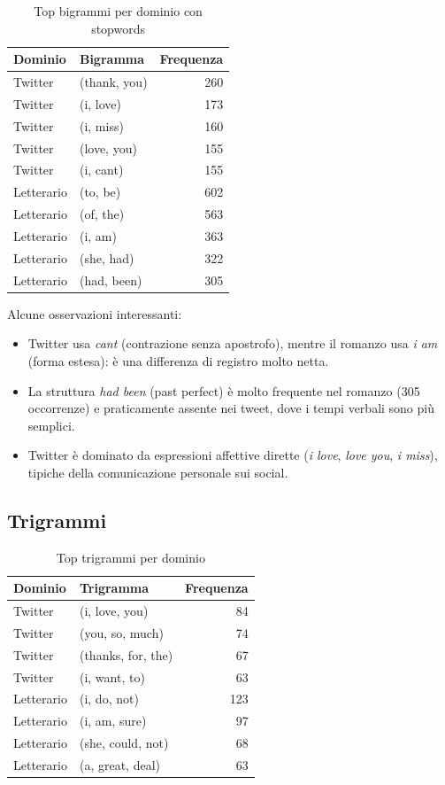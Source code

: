 \documentclass[12pt, a4paper]{article}
\begin{document}
\begin{table}[H]
\centering
\begin{tabular}{llr}
\toprule
\textbf{Dominio} & \textbf{Bigramma} & \textbf{Frequenza} \\
\midrule
Twitter & (thank, you) & 260 \\
Twitter & (i, love)    & 173 \\
Twitter & (i, miss)    & 160 \\
Twitter & (love, you)  & 155 \\
Twitter & (i, cant)    & 155 \\
\midrule
Letterario & (to, be)    & 602 \\
Letterario & (of, the)   & 563 \\
Letterario & (i, am)     & 363 \\
Letterario & (she, had)  & 322 \\
Letterario & (had, been) & 305 \\
\bottomrule
\end{tabular}
\caption{Top bigrammi per dominio con stopwords}
\end{table}

Alcune osservazioni interessanti:
\begin{itemize}[leftmargin=1.5cm]
    \item Twitter usa \textit{cant} (contrazione senza apostrofo),
          mentre il romanzo usa \textit{i am} (forma estesa): è una
          differenza di registro molto netta.
    \item La struttura \textit{had been} (past perfect) è molto
          frequente nel romanzo (305 occorrenze) e praticamente
          assente nei tweet, dove i tempi verbali sono più semplici.
    \item Twitter è dominato da espressioni affettive dirette
          (\textit{i love}, \textit{love you}, \textit{i miss}),
          tipiche della comunicazione personale sui social.
\end{itemize}

\subsection{Trigrammi}

\begin{table}[H]
\centering
\begin{tabular}{llr}
\toprule
\textbf{Dominio} & \textbf{Trigramma} & \textbf{Frequenza} \\
\midrule
Twitter & (i, love, you)     & 84 \\
Twitter & (you, so, much)    & 74 \\
Twitter & (thanks, for, the) & 67 \\
Twitter & (i, want, to)      & 63 \\
\midrule
Letterario & (i, do, not)      & 123 \\
Letterario & (i, am, sure)     & 97  \\
Letterario & (she, could, not) & 68  \\
Letterario & (a, great, deal)  & 63  \\
\bottomrule
\end{tabular}
\caption{Top trigrammi per dominio}
\end{table}
\end{document}
